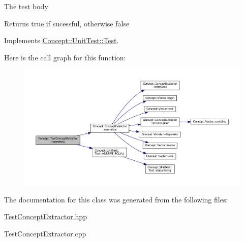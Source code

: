 The test body \begin{DoxyReturn}{Returns}
true if sucessful, otherwise false 
\end{DoxyReturn}


Implements \mbox{\hyperlink{class_concept_1_1_unit_test_1_1_test_aa8c081714f642696eeef640911be752a}{Concept\+::\+Unit\+Test\+::\+Test}}.

Here is the call graph for this function\+:\nopagebreak
\begin{figure}[H]
\begin{center}
\leavevmode
\includegraphics[width=350pt]{class_concept_1_1_test_concept_extractor_a32d377bd7d03420a7f470a840cd654cc_cgraph}
\end{center}
\end{figure}


The documentation for this class was generated from the following files\+:\begin{DoxyCompactItemize}
\item 
\mbox{\hyperlink{_test_concept_extractor_8hpp}{Test\+Concept\+Extractor.\+hpp}}\item 
Test\+Concept\+Extractor.\+cpp\end{DoxyCompactItemize}
